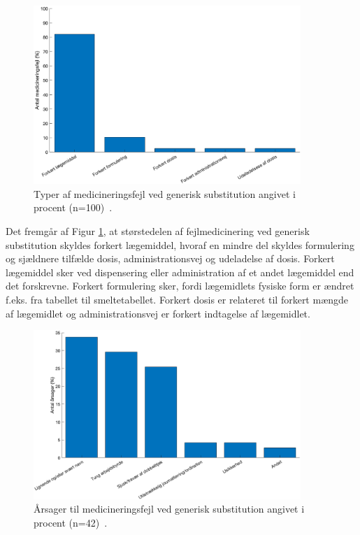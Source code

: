 \begin{figure}[H]\centering	\includegraphics[width=0.9\textwidth]{billeder/GenSubb.png} 
	\caption{Typer af medicineringsfejl ved generisk substitution angivet i procent (n=100)~\citep{Hakonsen2010}.}
	\label{fig:GeneriskSubstitution}  
\end{figure}
\vspace{-0.5cm}

Det fremgår af Figur \ref{fig:GeneriskSubstitution}, at  størstedelen af fejlmedicinering ved generisk substitution skyldes forkert lægemiddel, hvoraf en mindre del skyldes formulering og sjældnere tilfælde dosis, administrationsvej og udeladelse af dosis. Forkert lægemiddel sker ved dispensering eller administration af et andet lægemiddel end det forskrevne. Forkert formulering sker, fordi lægemidlets fysiske form er ændret f.eks. fra tabellet til smeltetabellet. Forkert dosis er relateret til forkert mængde af lægemidlet og administrationsvej er forkert indtagelse af lægemidlet. 

\vspace{-0.2cm}
\begin{figure}[H]\centering	\includegraphics[width=0.9\textwidth]{billeder/GenSubbb.png} 
	\caption{Årsager til medicineringsfejl ved generisk substitution angivet i procent (n=42)~\citep{Hakonsen2010}.}	\label{fig:GeneriskSubstitution1}  
\end{figure}
\vspace{-1cm}


